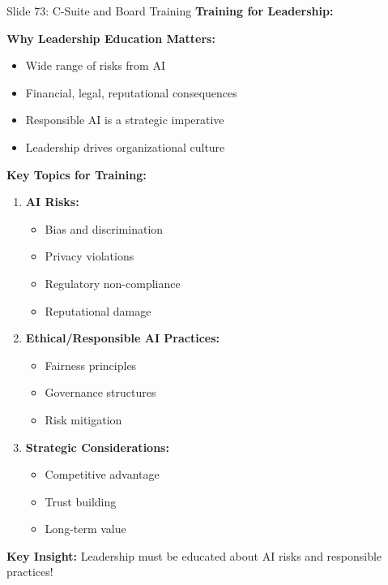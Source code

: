 \documentclass[8pt]{beamer}
\begin{document}
	\begin{frame}{Slide 73: C-Suite and Board Training}
		\fontsize{6.5}{7.5}\selectfont
		\textbf{Training for Leadership:}
		
		\vspace{0.1cm}
		\textbf{Why Leadership Education Matters:}
		\begin{itemize}
			\item Wide range of risks from AI
			\item Financial, legal, reputational consequences
			\item Responsible AI is a strategic imperative
			\item Leadership drives organizational culture
		\end{itemize}
		
		\vspace{0.1cm}
		\textbf{Key Topics for Training:}
		\begin{enumerate}
			\item \textbf{AI Risks:}
			\begin{itemize}
				\item Bias and discrimination
				\item Privacy violations
				\item Regulatory non-compliance
				\item Reputational damage
			\end{itemize}
			\item \textbf{Ethical/Responsible AI Practices:}
			\begin{itemize}
				\item Fairness principles
				\item Governance structures
				\item Risk mitigation
			\end{itemize}
			\item \textbf{Strategic Considerations:}
			\begin{itemize}
				\item Competitive advantage
				\item Trust building
				\item Long-term value
			\end{itemize}
		\end{enumerate}
		
		\textcolor{myblue}{\textbf{Key Insight:}} Leadership must be \textcolor{myblue}{educated about AI risks and responsible practices}!
	\end{frame}
	
\end{document}
